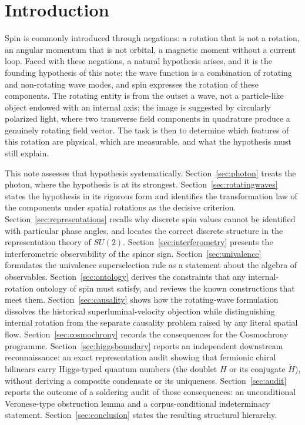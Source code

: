 \documentclass[11pt,a4paper]{article}
\begin{document}
\clearpage
\tableofcontents

\clearpage
\section{Introduction}
\label{sec:introduction}

Spin is commonly introduced through negations: a rotation that is not a rotation, an angular momentum that
is not orbital, a magnetic moment without a current loop.
Faced with these negations, a natural hypothesis arises, and it is the founding hypothesis of this note:
the wave function is a combination of rotating and non-rotating wave modes, and spin expresses the rotation
of these components.
The rotating entity is from the outset a wave, not a particle-like object endowed with an internal axis;
the image is suggested by circularly polarized light, where two transverse field components in quadrature
produce a genuinely rotating field vector.
The task is then to determine which features of this rotation are physical, which are measurable, and what
the hypothesis must still explain.

This note assesses that hypothesis systematically.
Section~\ref{sec:photon} treats the photon, where the hypothesis is at its strongest.
Section~\ref{sec:rotatingwaves} states the hypothesis in its rigorous form and identifies the
transformation law of the components under spatial rotations as the decisive criterion.
Section~\ref{sec:representations} recalls why discrete spin values cannot be identified with particular
phase angles, and locates the correct discrete structure in the representation theory of $SU(2)$.
Section~\ref{sec:interferometry} presents the interferometric observability of the spinor sign.
Section~\ref{sec:univalence} formulates the univalence superselection rule as a statement about the algebra
of observables.
Section~\ref{sec:ontology} derives the constraints that any internal-rotation ontology of spin must satisfy,
and reviews the known constructions that meet them.
Section~\ref{sec:causality} shows how the rotating-wave formulation dissolves the historical
superluminal-velocity objection while distinguishing internal rotation from the separate causality problem
raised by any literal spatial flow.
Section~\ref{sec:cosmochrony} records the consequences for the Cosmochrony programme.
Section~\ref{sec:higgsboundary} reports an independent downstream reconnaissance: an exact
representation audit showing that fermionic chiral bilinears carry Higgs-typed quantum numbers (the
doublet $H$ or its conjugate $\widetilde{H}$), without deriving a composite condensate or its
uniqueness.
Section~\ref{sec:audit} reports the outcome of a soldering audit of those consequences: an unconditional
Veronese-type obstruction lemma and a corpus-conditional indeterminacy statement.
Section~\ref{sec:conclusion} states the resulting structural hierarchy.
\end{document}
